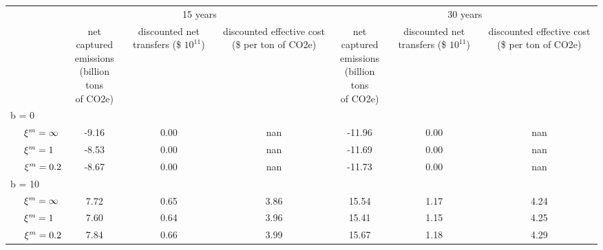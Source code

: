 
\begin{tabular}[t]{lcccccc}
\toprule

& \multicolumn{3}{c}{15 years} & \multicolumn{3}{c}{30 years} \\
\cmidrule[1pt](r){2-4} \cmidrule[1pt](r){5-7} 
 & \makecell[c]{net captured \\ emissions \\ (billion tons \\ of CO2e)} & \makecell[c]{ discounted \\ net transfers \\ \\ (\$ $10^{11}$)} & \makecell[c]{discounted \\ effective cost \\ (\$ per ton \\ of CO2e)} &
\makecell[c]{net captured \\ emissions \\ (billion tons \\ of CO2e)} & \makecell[c]{discounted \\ net transfers \\ \\ (\$ $10^{11}$)} & \makecell[c]{discounted \\ effective cost \\ (\$ per ton \\ of CO2e)}\\
\midrule  

\multicolumn{7}{l}{ \hspace{3.8 mm} b = 0}  \\  
 
$\hspace{.5cm} \xi^m = \infty$ & -9.16 & 0.00 & nan & -11.96 & 0.00 & nan\\

$\hspace{.5cm} \xi^m = 1$ & -8.53 & 0.00 & nan& -11.69 & 0.00 & nan \\

$\hspace{.5cm} \xi^m = 0.2$ &  -8.67 & 0.00 & nan& -11.73 & 0.00 & nan \\




\multicolumn{7}{l}{ \hspace{3.8 mm} b = 10}  \\  
 
$\hspace{.5cm} \xi^m = \infty$ & 7.72 & 0.65 & 3.86& 15.54 & 1.17 & 4.24 \\

$\hspace{.5cm} \xi^m = 1$ &7.60 & 0.64 & 3.96 & 15.41 & 1.15 & 4.25 \\

$\hspace{.5cm} \xi^m = 0.2$ &  7.84 & 0.66 & 3.99& 15.67 & 1.18 & 4.29 \\

\bottomrule
\end{tabular}
